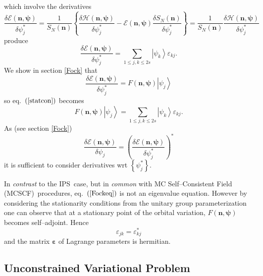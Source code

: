 \documentclass[aps,preprint]{revtex4}%
\begin{document}
which involve the derivatives
\begin{equation}
\frac{\delta\mathcal{E}\left(  \bm{n,\psi}\right)  }{\delta\psi_{j}^{\ast}%
}=\frac{1}{S_{N}\left(  \bm{n}\right)  }\left\{  \frac{\delta\mathcal{H}%
\left(  \bm{n,\psi}\right)  }{\delta\psi_{j}^{\ast}}-\mathcal{E}\left(
\bm{n,\psi}\right)  \frac{\delta S_{N}\left(  \bm{n}\right)  }{\delta\psi
_{j}^{\ast}}\right\}  =\frac{1}{S_{N}\left(  \bm{n}\right)  }\frac
{\delta\mathcal{H}\left(  \bm{n,\psi}\right)  }{\delta\psi_{j}^{\ast}}%
\end{equation}
produce
\begin{equation}
\frac{\delta\mathcal{E}\left(  \bm{n,\psi}\right)  }{\delta\psi_{j}^{\ast}%
}=\sum_{1\leq j,k\leq2s}\left\vert \psi_{k}\right\rangle \varepsilon_{kj}.
\label{statcon}%
\end{equation}
We show in section \ref{Fock} that
\begin{equation}
\frac{\delta\mathcal{E}\left(  \bm{n,\psi}\right)  }{\delta\psi_{j}^{\ast}%
}=F\left(  \bm{n,\psi}\right)  \left\vert \psi_{j}\right\rangle
\end{equation}
so eq.\ $\left(  \ref{statcon}\right)  $ becomes
\begin{equation}
F\left(  \bm{n,\psi}\right)  \left\vert \psi_{j}\right\rangle =\sum_{1\leq
j,k\leq2s}\left\vert \psi_{k}\right\rangle \varepsilon_{kj}. \label{Fockeq}%
\end{equation}
As (see section \ref{Fock})%
\begin{equation}
\frac{\delta\mathcal{E}\left(  \bm{n,\psi}\right)  }{\delta\psi_{j}}=\left(
\frac{\delta\mathcal{E}\left(  \bm{n,\psi}\right)  }{\delta\psi_{j}^{\ast}%
}\right)  ^{\ast}%
\end{equation}
it is sufficient to consider derivatives wrt $\left\{  \psi_{j}^{\ast
}\right\}  $.

In \emph{contrast} to the IPS\ case, but in \emph{common} with MC
Self--Consistent Field (MCSCF)\ procedures, eq.\ $\left(  \ref{Fockeq}\right)
$ is not an eigenvalue equation. However by considering the stationarity
conditions from the unitary group parameterization one can observe that at a
stationary point of the orbital variation, $F\left(  \bm{n,\psi}\right)  $
becomes self--adjoint. Hence
\begin{equation}
\varepsilon_{jk}=\varepsilon_{kj}^{\ast}%
\end{equation}
and the matrix $\bm{\varepsilon}$ of Lagrange parameters is hermitian.

\subsection{Unconstrained Variational Problem\label{UCVP}}
\end{document}
